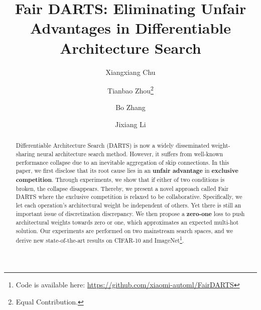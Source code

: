\documentclass[runningheads]{llncs}
\begin{document}
\pagestyle{headings}
\mainmatter
\def\ECCVSubNumber{2382}  



\title{Fair DARTS: Eliminating Unfair Advantages in Differentiable Architecture Search}

\begin{comment}
\titlerunning{ECCV-20 submission ID \ECCVSubNumber} 
\authorrunning{ECCV-20 submission ID \ECCVSubNumber} 
\author{Anonymous ECCV submission}
\institute{Paper ID \ECCVSubNumber}
\end{comment}



\author{Xiangxiang Chu  \and
Tianbao Zhou\thanks{Equal Contribution.}  \and
Bo Zhang  \and
Jixiang Li}


\maketitle


\begin{abstract}
Differentiable Architecture Search (DARTS) is now a widely disseminated weight-sharing neural architecture search method. However, it suffers from well-known performance collapse due to an inevitable aggregation of skip connections. In this paper, we first disclose that its root cause lies in an \textbf{unfair advantage} in  \textbf{exclusive competition}. Through experiments, we show that if either of two conditions is broken, the collapse disappears. Thereby, we present a novel approach called Fair DARTS where the exclusive competition is relaxed to  be collaborative. Specifically, we let each operation's architectural weight be independent of others. Yet there is still an important issue of discretization discrepancy. We then propose a \textbf{zero-one} loss to push architectural weights towards zero or one, which approximates an expected multi-hot solution. Our experiments are performed on two mainstream search spaces, and we derive new state-of-the-art results on CIFAR-10 and ImageNet\footnote{Code is available here: \url{https://github.com/xiaomi-automl/FairDARTS}}. 








\end{abstract}
\end{document}
